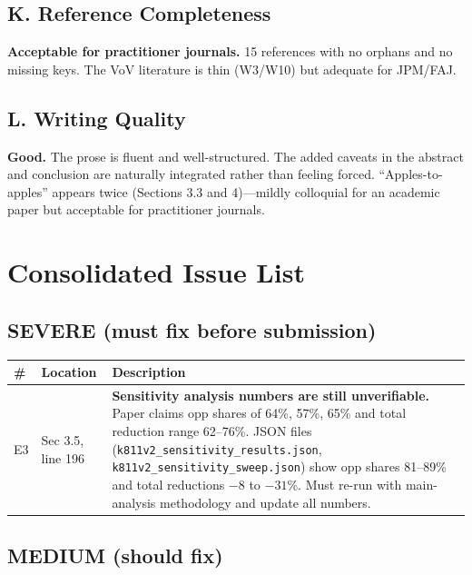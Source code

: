 \documentclass[12pt,a4paper]{article}
\begin{document}
\subsection*{K. Reference Completeness}

\textcolor{warncolor}{\textbf{Acceptable for practitioner journals.}} 15 references with no orphans and no missing keys. The VoV literature is thin (W3/W10) but adequate for JPM/FAJ.

\subsection*{L. Writing Quality}

\textcolor{okgreen}{\textbf{Good.}} The prose is fluent and well-structured. The added caveats in the abstract and conclusion are naturally integrated rather than feeling forced. ``Apples-to-apples'' appears twice (Sections 3.3 and 4)---mildly colloquial for an academic paper but acceptable for practitioner journals.

\section*{Consolidated Issue List}

\subsection*{\textcolor{errorred}{SEVERE (must fix before submission)}}

\begin{longtable}{p{0.6cm}p{2.5cm}p{10.5cm}}
\toprule
\# & Location & Description \\
\midrule
E3 & Sec 3.5, line 196 & \textbf{Sensitivity analysis numbers are still unverifiable.} Paper claims opp shares of 64\%, 57\%, 65\% and total reduction range 62--76\%. JSON files (\texttt{k811v2\_sensitivity\_results.json}, \texttt{k811v2\_sensitivity\_sweep.json}) show opp shares 81--89\% and total reductions $-8$ to $-31$\%. Must re-run with main-analysis methodology and update all numbers. \\
\bottomrule
\end{longtable}

\subsection*{\textcolor{warncolor}{MEDIUM (should fix)}}
\end{document}
